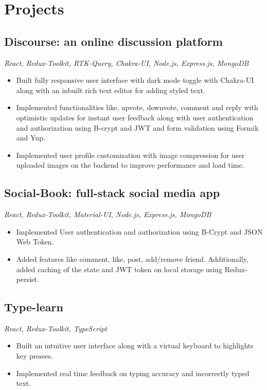 \documentclass[a4paper]{article}
\begin{document}
\section{Projects}
\subsection{Discourse: an online discussion platform}
\textit{React, Redux-Toolkit, RTK-Query, Chakra-UI, Node.js, Express.js, MongoDB}
\hfill
\href{https://discourse-app.netlify.app/}{ \faLink }
\textbar
\href{https://github.com/jatinkumar-me/Discourse}{ \faCode}
\begin{itemize}
    \item Built fully responsive user interface with dark mode toggle with Chakra-UI along with an inbuilt rich text editor for adding styled text.  
    \item Implemented functionalities like, upvote, downvote, comment and reply with optimistic updates for instant user feedback along with user authentication and authorization using B-crypt and JWT and form validation using Formik and Yup. 
    \item Implemented user profile customization with image compression for user uploaded images on the backend to improve performance and load time.
\end{itemize}

\subsection{Social-Book: full-stack social media app}
\textit{React, Redux-Toolkit, Material-UI, Node.js, Express.js, MongoDB}
\hfill
\href{https://discourse-app.netlify.app/}{ \faLink }
\textbar
\href{https://github.com/jatinkumar-me/social-book}{ \faCode}
\begin{itemize}
    \item Implemented User authentication and authorization using B-Crypt and JSON Web Token. 
    \item Added features like comment, like, post, add/remove friend. Additionally, added caching of the state and JWT token on local storage using Redux-persist.
\end{itemize}

\subsection{Type-learn}
\textit{React, Redux-Toolkit, TypeScript}
\hfill
\href{https://type-learn.netlify.app/}{ \faLink }
\textbar
\href{https://github.com/jatinkumar-me/type-learn}{ \faCode}
\begin{itemize}
    \item Built an intuitive user interface along with a virtual keyboard to highlights key presses.
    \item Implemented real time feedback on typing accuracy and incorrectly typed text.
\end{itemize}
\end{document}
